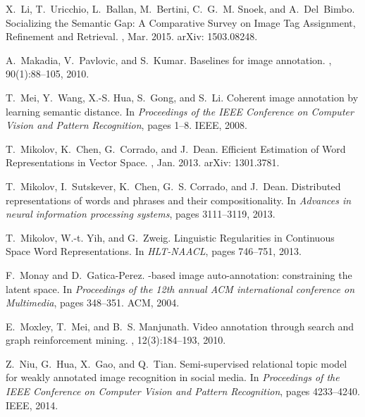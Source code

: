 \documentclass[10pt,twocolumn,letterpaper]{article}
\begin{document}
\begin{thebibliography}{10}
X.~Li, T.~Uricchio, L.~Ballan, M.~Bertini, C.~G.~M. Snoek, and A.~Del~Bimbo.
\newblock Socializing the {Semantic} {Gap}: {A} {Comparative} {Survey} on
  {Image} {Tag} {Assignment}, {Refinement} and {Retrieval}.
, Mar. 2015.
\newblock arXiv: 1503.08248.

A.~Makadia, V.~Pavlovic, and S.~Kumar.
\newblock Baselines for image annotation.
, 90(1):88--105, 2010.

T.~Mei, Y.~Wang, X.-S. Hua, S.~Gong, and S.~Li.
\newblock Coherent image annotation by learning semantic distance.
\newblock In {\em Proceedings of the {IEEE} {Conference} on {Computer} {Vision}
  and {Pattern} {Recognition}}, pages 1--8. IEEE, 2008.

T.~Mikolov, K.~Chen, G.~Corrado, and J.~Dean.
\newblock Efficient {Estimation} of {Word} {Representations} in {Vector}
  {Space}.
, Jan. 2013.
\newblock arXiv: 1301.3781.

T.~Mikolov, I.~Sutskever, K.~Chen, G.~S. Corrado, and J.~Dean.
\newblock Distributed representations of words and phrases and their
  compositionality.
\newblock In {\em Advances in neural information processing systems}, pages
  3111--3119, 2013.

T.~Mikolov, W.-t. Yih, and G.~Zweig.
\newblock Linguistic {Regularities} in {Continuous} {Space} {Word}
  {Representations}.
\newblock In {\em {HLT}-{NAACL}}, pages 746--751, 2013.

F.~Monay and D.~Gatica-Perez.
-based image auto-annotation: constraining the latent space.
\newblock In {\em Proceedings of the 12th annual {ACM} international conference
  on {Multimedia}}, pages 348--351. ACM, 2004.

E.~Moxley, T.~Mei, and B.~S. Manjunath.
\newblock Video annotation through search and graph reinforcement mining.
, 12(3):184--193, 2010.

Z.~Niu, G.~Hua, X.~Gao, and Q.~Tian.
\newblock Semi-supervised relational topic model for weakly annotated image
  recognition in social media.
\newblock In {\em Proceedings of the {IEEE} {Conference} on {Computer} {Vision}
  and {Pattern} {Recognition}}, pages 4233--4240. IEEE, 2014.


\end{thebibliography}
\end{document}
